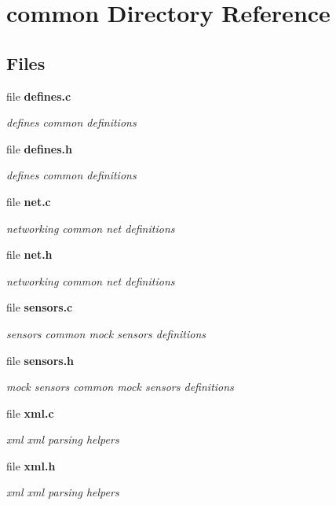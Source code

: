 \section{common Directory Reference}
\label{dir_bdd9a5d540de89e9fe90efdfc6973a4f}
\subsection*{Files}
\begin{DoxyCompactItemize}
\item 
file {\bf defines.\-c}
\begin{DoxyCompactList}\small\item\em defines common definitions \end{DoxyCompactList}\item 
file {\bf defines.\-h}
\begin{DoxyCompactList}\small\item\em defines common definitions \end{DoxyCompactList}\item 
file {\bf net.\-c}
\begin{DoxyCompactList}\small\item\em networking common net definitions \end{DoxyCompactList}\item 
file {\bf net.\-h}
\begin{DoxyCompactList}\small\item\em networking common net definitions \end{DoxyCompactList}\item 
file {\bf sensors.\-c}
\begin{DoxyCompactList}\small\item\em sensors common mock sensors definitions \end{DoxyCompactList}\item 
file {\bf sensors.\-h}
\begin{DoxyCompactList}\small\item\em mock sensors common mock sensors definitions \end{DoxyCompactList}\item 
file {\bf xml.\-c}
\begin{DoxyCompactList}\small\item\em xml xml parsing helpers \end{DoxyCompactList}\item 
file {\bf xml.\-h}
\begin{DoxyCompactList}\small\item\em xml xml parsing helpers \end{DoxyCompactList}\end{DoxyCompactItemize}
